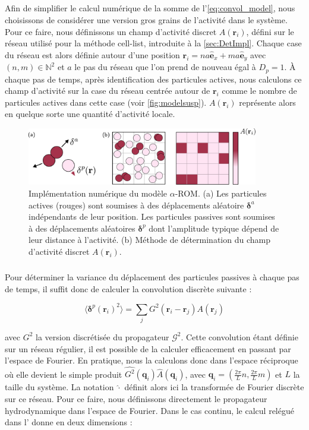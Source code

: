 \subparagraph{}Afin de simplifier le calcul numérique de la somme de l'\autoref{eq:convol_model}, nous choisissons de considérer une version gros grains de l'activité dans le système. Pour ce faire, nous définissons un champ d'activité discret $A(\mathbf{r}_i)$, défini sur le réseau utilisé pour la méthode cell-list, introduite à la \autoref{sec:DetImpl}. Chaque case du réseau est alors définie autour d'une position $\mathbf{r}_i = na\hat{\mathbf{e}}_x + ma \hat{\mathbf{e}}_y$ avec $(n,m) \in \mathbb{N}^2$ et $a$ le pas du réseau que l'on prend de nouveau égal à $D_p=1$. \`A chaque pas de temps, après identification des particules actives, nous calculons ce champ d'activité sur la case du réseau centrée autour de $\mathbf{r}_i$ comme le nombre de particules actives dans cette case (voir \autoref{fig:modelsusp}). $A(\mathbf{r}_i)$ représente alors en quelque sorte une quantité d'activité locale.

\begin{figure}[h]
	\centering
	\includegraphics[width=0.9\textwidth]{Chapitre3/Figures/Method/Model.pdf}
	\caption{Implémentation numérique du modèle $\alpha$-ROM. (a) Les particules actives (rouges) sont soumises à des déplacements aléatoire $\boldsymbol\delta^a$ indépendants de leur position. Les particules passives sont soumises à des déplacements aléatoires $\boldsymbol\delta^p$ dont l'amplitude typique dépend de leur distance à l'activité. (b) Méthode de détermination du champ d'activité discret $A(\mathbf{r}_i)$.}
	\label{fig:modelsusp}
\end{figure}

\subparagraph{}Pour déterminer la variance du déplacement des particules passives à chaque pas de temps, il suffit donc de calculer la convolution discrète suivante :

\begin{equation}
	\langle \boldsymbol\delta^p(\mathbf{r}_i)^2\rangle = \sum_{j} G^2(\mathbf{r}_i-\mathbf{r}_j) A(\mathbf{r}_j)
	\label{eq:kick_discret}
\end{equation}

\noindent avec $G^2$ la version discrétisée du propagateur $\mathcal{G}^2$. Cette convolution étant définie sur un réseau régulier, il est possible de la calculer efficacement en passant par l'espace de Fourier. En pratique, nous la calculons donc dans l'espace réciproque où elle devient le simple produit $\hat{G^2}(\mathbf{q}_i)\hat{A}(\mathbf{q}_i)$, avec $\mathbf{q}_i = (\frac{2\pi}{L}n, \frac{2\pi}{L}m)$ et $L$ la taille du système. La notation $\hat{\cdot}$ définit alors ici la transformée de Fourier discrète sur ce réseau. Pour ce faire, nous définissons directement le propagateur hydrodynamique dans l'espace de Fourier. Dans le cas continu, le calcul relégué dans l' donne en deux dimensions :


